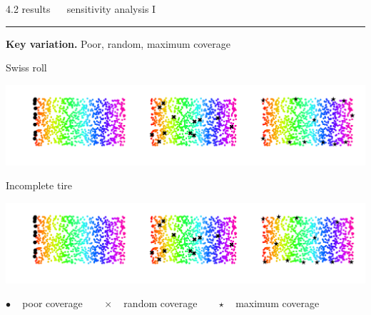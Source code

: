 \documentclass[11pt, compress, t, notes = noshow, xcolor = table, 
aspectratio = 1610]{beamer}
\begin{document}
\LARGE
\begin{frame}{\textcolor{gray!90}{4.2 results} ~~ sensitivity analysis I}
\normalsize
\vspace{-0.5cm}
\noindent \textcolor{gray!90}{\rule{\textwidth}{1pt}}
\smallskip

\textbf{Key variation.} Poor, random, maximum coverage

\vspace{0.3cm}

\begin{minipage}[c]{0.2\textwidth}
  Swiss roll
\end{minipage}%
\begin{minipage}[c]{0.8\textwidth}
  \includegraphics[trim = 40 20 0 0, clip, %
    width = \textwidth]{figures/sensitivity_landmarks_key_swiss}
\end{minipage}

\vspace{0.3cm}   

\begin{minipage}[c]{0.2\textwidth}
  Incomplete tire
\end{minipage}%
\begin{minipage}[c]{0.8\textwidth}
  \includegraphics[trim = 40 20 0 0, clip, %
    width = \textwidth]{figures/sensitivity_landmarks_key_tire}
\end{minipage}

\vfill

\scriptsize
$\bullet$ ~ poor coverage ~~~ $\bm{\times}$ ~ random coverage ~~~
$\star$ ~ maximum coverage

\end{frame}

\end{document}

